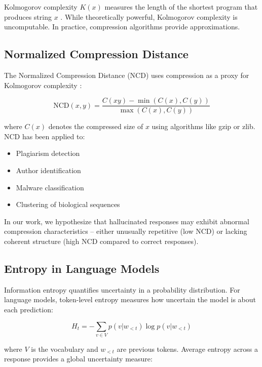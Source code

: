 Kolmogorov complexity $K(x)$ measures the length of the shortest program that produces string $x$ \cite{li2008introduction}. While theoretically powerful, Kolmogorov complexity is uncomputable. In practice, compression algorithms provide approximations.

\subsection{Normalized Compression Distance}

The Normalized Compression Distance (NCD) uses compression as a proxy for Kolmogorov complexity \cite{cilibrasi2005clustering}:

\begin{equation}
    \text{NCD}(x, y) = \frac{C(xy) - \min(C(x), C(y))}{\max(C(x), C(y))}
\end{equation}

where $C(x)$ denotes the compressed size of $x$ using algorithms like gzip or zlib. NCD has been applied to:

\begin{itemize}
    \item Plagiarism detection
    \item Author identification
    \item Malware classification
    \item Clustering of biological sequences
\end{itemize}

In our work, we hypothesize that hallucinated responses may exhibit abnormal compression characteristics -- either unusually repetitive (low NCD) or lacking coherent structure (high NCD compared to correct responses).

\subsection{Entropy in Language Models}

Information entropy quantifies uncertainty in a probability distribution. For language models, token-level entropy measures how uncertain the model is about each prediction:

\begin{equation}
    H_t = -\sum_{v \in V} p(v | w_{<t}) \log p(v | w_{<t})
\end{equation}

where $V$ is the vocabulary and $w_{<t}$ are previous tokens. Average entropy across a response provides a global uncertainty measure:

